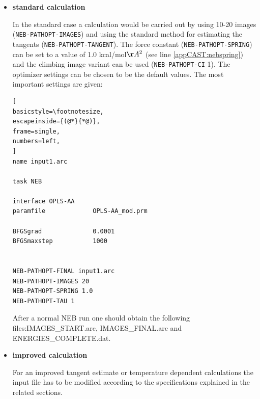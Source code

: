 \documentclass[a4paper,11pt]{scrartcl}
\begin{document}
\begin{itemize}
\begin{itemize}

\item \textbf{standard calculation} \newline

In the standard case a calculation would be carried out by using 10-20 images (\texttt{NEB-PATHOPT-IMAGES}) and using the standard method for estimating the tangents (\texttt{NEB-PATHOPT-TANGENT}). The force constant (\texttt{NEB-PATHOPT-SPRING}) can be set to a value of 1.0 kcal/mol$\AA^{2}$ (see line \ref{appCAST:nebspring}) and the climbing image variant can be used (\texttt{NEB-PATHOPT-CI} 1). The optimizer settings can be chosen to be the default values. The most important settings are given:


\begin{lstlisting}[
basicstyle=\footnotesize,
escapeinside={(@*}{*@)},
frame=single,
numbers=left,
]
name input1.arc

task NEB

interface OPLS-AA
paramfile             OPLS-AA_mod.prm

BFGSgrad              0.0001
BFGSmaxstep           1000


NEB-PATHOPT-FINAL input1.arc
NEB-PATHOPT-IMAGES 20
NEB-PATHOPT-SPRING 1.0
NEB-PATHOPT-TAU 1

\end{lstlisting}

After a normal NEB run one should obtain the following files:IMAGES\_START.arc, IMAGES\_FINAL.arc and ENERGIES\_COMPLETE.dat.

\item \textbf{improved calculation} \newline

For an improved tangent estimate or temperature dependent calculations the input file has to be modified according to the specifications explained in the related sections.


\end{itemize}
\end{itemize}
\end{document}
